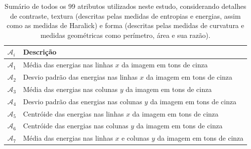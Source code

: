\begin{table}
  \begin{center}
  \caption{\label{tab:atributos}Sumário de todos os 99 atributos utilizados
    neste estudo, considerando detalhes de contraste, textura (descritas pelas
    medidas de entropias e energias, assim como as medidas de Haralick) e forma
    (descritas pelas medidas de curvatura e medidas geométricas como perímetro,
    área e sua razão).}

  \begin{tabular}{l|l}
    \hline
    $\mathcal{A}_i$ & Descrição \\
    \hline

    $\mathcal{A}_1$ & 
    Média das energias nas linhas $x$ da imagem em tons de cinza \\

    $\mathcal{A}_2$ &
    Desvio padrão das energias nas linhas $x$ da imagem em tons de cinza \\

    $\mathcal{A}_3$ &
    Média das energias nas colunas $y$ da imagem em tons de cinza \\

    $\mathcal{A}_4$ &
    Desvio padrão das energias nas colunas $y$ da imagem em tons de cinza \\

    $\mathcal{A}_5$ &
    Centróide das energias nas linhas $x$ da imagem em tons de cinza \\

    $\mathcal{A}_6$ &
    Centróide das energias nas colunas $y$ da imagem em tons de cinza \\

    $\mathcal{A}_7$ &
    Média das energias nas linhas $x$ e colunas $y$ da imagem em tons de cinza \\


\end{tabular}
\end{center}
\end{table}
